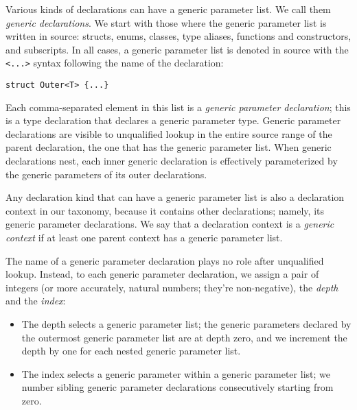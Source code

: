 \documentclass[../generics]{subfiles}
\begin{document}
Various kinds of declarations can have a generic parameter list. We call them \emph{generic declarations}. We start with those where the generic parameter list is written in source: structs, enums, classes, type aliases, functions and constructors, and subscripts. In all cases, a generic parameter list is denoted in source with the \texttt{<...>} syntax following the name of the declaration:
\begin{Verbatim}
struct Outer<T> {...}
\end{Verbatim}
Each comma-separated element in this list is a \emph{generic parameter declaration}; this is a type declaration that declares a generic parameter type. Generic parameter declarations are visible to unqualified lookup in the entire source range of the parent declaration, the one that has the generic parameter list. When generic declarations nest, each inner generic declaration is effectively parameterized by the generic parameters of its outer declarations.

Any declaration kind that can have a generic parameter list is also a declaration context in our taxonomy, because it contains other declarations; namely, its generic parameter declarations. We say that a declaration context is a \emph{generic context} if at least one parent context has a generic parameter list.

The name of a generic parameter declaration plays no role after unqualified lookup. Instead, to each generic parameter declaration, we assign a pair of integers (or more accurately, natural numbers; they're non-negative), the \emph{depth} and the \emph{index}:
\begin{itemize}
\item The depth selects a generic parameter list; the generic parameters declared by the outermost generic parameter list are at depth zero, and we increment the depth by one for each nested generic parameter list.
\item The index selects a generic parameter within a generic parameter list; we number sibling generic parameter declarations consecutively starting from zero.
\end{itemize}
\end{document}
